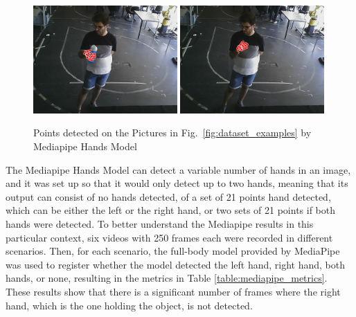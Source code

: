 \begin{figure}[H]
    \centerline{\includegraphics[width=0.49\textwidth]{figs/dataset_preprocessing2_1.png} \includegraphics[width=0.49\textwidth]{figs/dataset_preprocessing2_2.png}}
    \caption[Points detected on the Pictures in Fig.~\ref{fig:dataset_examples} by Mediapipe Hands Model]{Points detected on the Pictures in Fig.~\ref{fig:dataset_examples} by Mediapipe Hands Model}
    \label{fig:dataset_examples2}
\end{figure}

The Mediapipe Hands Model can detect a variable number of hands in an image, and it was set up so that it would only detect up to two hands, meaning that its output can consist of no hands detected, of a set of 21 points hand detected, which can be either the left or the right hand, or two sets of 21 points if both hands were detected. To better understand the Mediapipe results in this particular context, six videos with 250 frames each were recorded in different scenarios. Then, for each scenario, the full-body model provided by MediaPipe was used to register whether the model detected the left hand, right hand, both hands, or none, resulting in the metrics in Table \ref{table:mediapipe_metrics}. These results show that there is a significant number of frames where the right hand, which is the one holding the object, is not detected.

